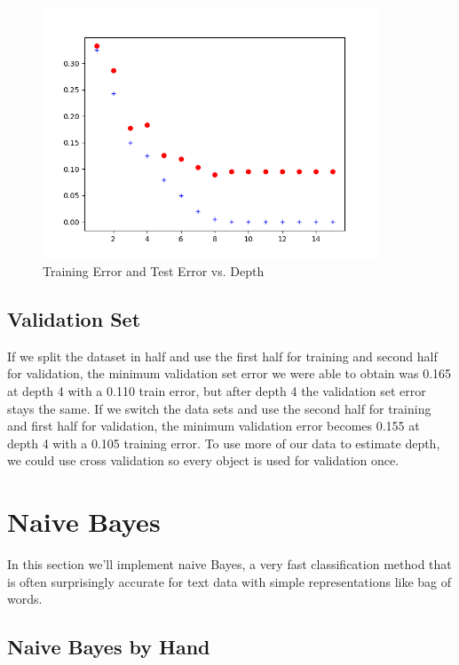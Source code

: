 \documentclass{article}
\begin{document}
\begin{figure}[h!]
  \includegraphics[height=7.5cm]{Etrain_Etest_vs_depth.png}
  \caption{Training Error and Test Error vs. Depth}
  \label{fig: error vs depth}
\end{figure}


\subsection{Validation Set}

If we split the dataset in half and use the first half for training and second half for validation, the minimum validation set error we were able to obtain was 0.165 at depth 4 with a 0.110 train error, but after depth 4 the validation set error stays the same. If we switch the data sets and use the second half for training and first half for validation, the minimum validation error becomes 0.155 at depth 4 with a 0.105 training error. To use more of our data to estimate depth, we could use cross validation so every object is used for validation once.

\section{Naive Bayes}

In this section we'll implement naive Bayes, a very fast classification method that is often surprisingly accurate for text data with simple representations like bag of words.



\subsection{Naive Bayes by Hand}
\end{document}
